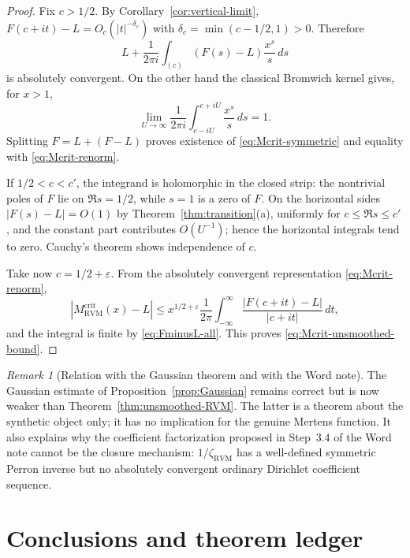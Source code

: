 \documentclass[11pt,reqno]{amsart}
\theoremstyle{definition}
\theoremstyle{remark}
\newtheorem{remark}[theorem]{Remark}
\newcommand{\RVM}{\mathrm{RVM}}
\newcommand{\crit}{\mathrm{crit}}
\begin{document}
\begin{proof}
Fix $c>1/2$.  By Corollary~\ref{cor:vertical-limit},
$F(c+it)-L=O_c(|t|^{-\delta_c})$ with $\delta_c=\min(c-1/2,1)>0$.  Therefore
\begin{equation}\label{eq:Mcrit-renorm}
 L+\frac1{2\pi i}\int_{(c)}(F(s)-L)\frac{x^s}{s}\,ds
\end{equation}
is absolutely convergent.  On the other hand the classical Bromwich kernel gives, for $x>1$,
\[
 \lim_{U\to\infty}\frac1{2\pi i}\int_{c-iU}^{c+iU}\frac{x^s}{s}\,ds=1.
\]
Splitting $F=L+(F-L)$ proves existence of \eqref{eq:Mcrit-symmetric} and equality with \eqref{eq:Mcrit-renorm}.

If $1/2<c<c'$, the integrand is holomorphic in the closed strip: the nontrivial poles of $F$ lie on $\Re s=1/2$, while $s=1$ is a zero of $F$.  On the horizontal sides $|F(s)-L|=O(1)$ by Theorem~\ref{thm:transition}(a), uniformly for $c\le\Re s\le c'$, and the constant part contributes $O(U^{-1})$; hence the horizontal integrals tend to zero.  Cauchy's theorem shows independence of $c$.

Take now $c=1/2+\varepsilon$.  From the absolutely convergent representation \eqref{eq:Mcrit-renorm},
\[
 |M_{\RVM}^{\crit}(x)-L|
 \le x^{1/2+\varepsilon}\frac1{2\pi}
 \int_{-\infty}^{\infty}\frac{|F(c+it)-L|}{|c+it|}\,dt,
\]
and the integral is finite by \eqref{eq:FminusL-all}.  This proves \eqref{eq:Mcrit-unsmoothed-bound}.
\end{proof}

\begin{remark}[Relation with the Gaussian theorem and with the Word note]
The Gaussian estimate of Proposition~\ref{prop:Gaussian} remains correct but is now weaker than Theorem~\ref{thm:unsmoothed-RVM}.  The latter is a theorem about the synthetic object only; it has no implication for the genuine Mertens function.  It also explains why the coefficient factorization proposed in Step~3.4 of the Word note cannot be the closure mechanism: $1/\zeta_{\RVM}$ has a well-defined symmetric Perron inverse but no absolutely convergent ordinary Dirichlet coefficient sequence.
\end{remark}

\section{Conclusions and theorem ledger}
\end{document}

